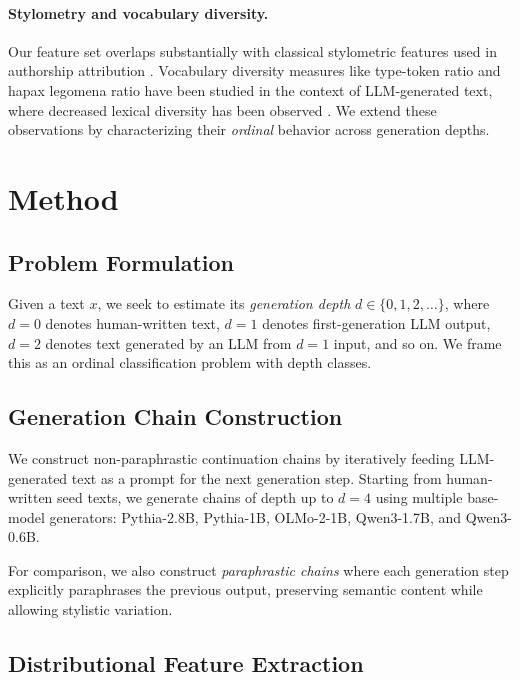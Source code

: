 \documentclass[11pt,a4paper]{article}
\begin{document}
\paragraph{Stylometry and vocabulary diversity.} Our feature set overlaps substantially with classical stylometric features used in authorship attribution \citep{stamatatos2009survey,koppel2009computational}. Vocabulary diversity measures like type-token ratio and hapax legomena ratio have been studied in the context of LLM-generated text, where decreased lexical diversity has been observed \citep{guo2024vocabulary,padmakumar2024writing,holtzman2020curious}. We extend these observations by characterizing their \emph{ordinal} behavior across generation depths.

\section{Method}

\subsection{Problem Formulation}

Given a text $x$, we seek to estimate its \emph{generation depth} $d \in \{0, 1, 2, \ldots\}$, where $d=0$ denotes human-written text, $d=1$ denotes first-generation LLM output, $d=2$ denotes text generated by an LLM from $d=1$ input, and so on. We frame this as an ordinal classification problem with depth classes.

\subsection{Generation Chain Construction}

We construct non-paraphrastic continuation chains by iteratively feeding LLM-generated text as a prompt for the next generation step. Starting from human-written seed texts, we generate chains of depth up to $d=4$ using multiple base-model generators: Pythia-2.8B, Pythia-1B, OLMo-2-1B, Qwen3-1.7B, and Qwen3-0.6B.

For comparison, we also construct \emph{paraphrastic chains} where each generation step explicitly paraphrases the previous output, preserving semantic content while allowing stylistic variation.

\subsection{Distributional Feature Extraction}
\end{document}
